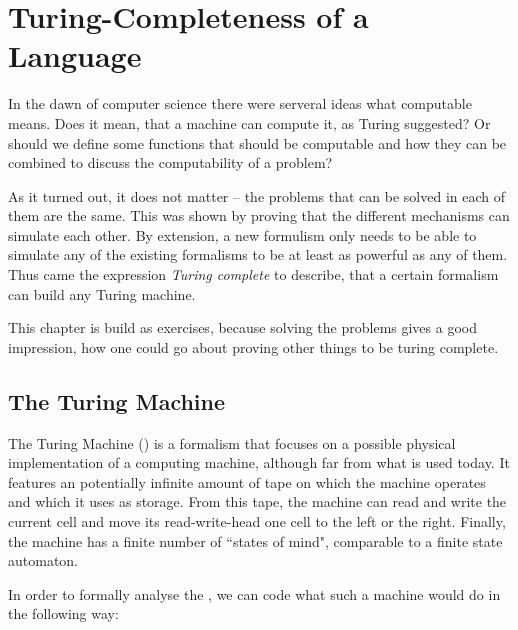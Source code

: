 \section{Turing-Completeness of a Language}
\label{sec:Turing Completeness}
In the dawn of computer science there were serveral ideas what computable 
means. Does it mean, that a machine can compute it, as Turing suggested? Or 
should we define some functions that should be computable and how they can be
combined to discuss the computability of a problem?

As it turned out, it does not matter -- the problems that can be solved in 
each of them are the same. This was shown by proving that the different 
mechanisms can simulate each other. By extension, a new formulism only needs 
to be able to simulate any of the existing formalisms to be at least as 
powerful as any of them. Thus came the expression {\em Turing complete} to 
describe, that a certain formalism can build any Turing machine.

This chapter is build as exercises, because solving the problems gives a good 
impression, how one could go about proving other things to be turing complete.

\subsection{The Turing Machine}
The Turing Machine (\TM) is a formalism that focuses on a possible physical 
implementation of a computing machine, although far from what is used today. 
It features an potentially infinite amount of tape on which the machine 
operates and which it uses as storage. From this tape, the machine can read and
write the current cell and move its read-write-head one cell to the left or the
right. Finally, the machine has a finite number of ``states of mind",
comparable to a finite state automaton.

In order to formally analyse the \TM, we can code what such a machine would 
do in the following way:

